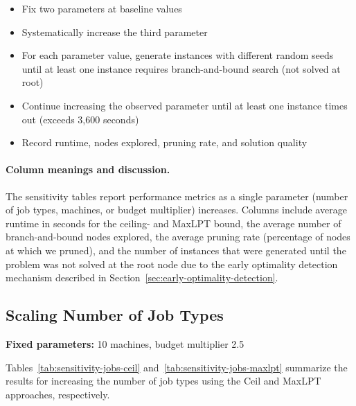 \begin{itemize}
    \item Fix two parameters at baseline values
    \item Systematically increase the third parameter
    \item For each parameter value, generate instances with different random seeds until at least one instance requires branch-and-bound search (not solved at root)
    \item Continue increasing the observed parameter until at least one instance times out (exceeds 3,600 seconds)
    \item Record runtime, nodes explored, pruning rate, and solution quality
\end{itemize}

\paragraph{Column meanings and discussion.}
The sensitivity tables report performance metrics as a single parameter (number of job types, machines, or budget multiplier) increases. 
Columns include average runtime in seconds for the ceiling- and MaxLPT bound, the average number of branch-and-bound nodes explored, the average pruning rate (percentage of nodes at which we pruned), 
and the number of instances that were generated until the problem was not solved at the root node due to the early optimality detection mechanism described in Section~\ref{sec:early-optimality-detection}.

\subsection{Scaling Number of Job Types}

\textbf{Fixed parameters:} 10 machines, budget multiplier 2.5



Tables~\ref{tab:sensitivity-jobs-ceil} and~\ref{tab:sensitivity-jobs-maxlpt} summarize the results for increasing the number of job types using the Ceil and MaxLPT approaches, respectively.

